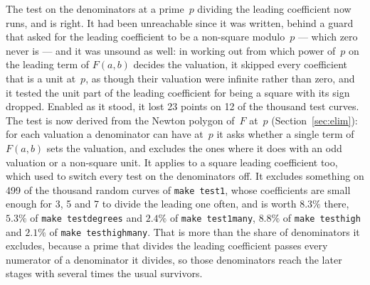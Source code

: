 \documentclass[12pt,a4paper,oneside]{amsart}
\begin{document}
The test on the denominators at a prime~$p$ dividing the leading coefficient
now runs, and is right. It had been unreachable since it was written, behind
a guard that asked for the leading coefficient to be a non-square modulo~$p$
--- which zero never is --- and it was unsound as well: in working out from
which power of~$p$ on the leading term of $F(a,b)$ decides the valuation, it
skipped every coefficient that is a unit at~$p$, as though their valuation
were infinite rather than zero, and it tested the unit part of the leading
coefficient for being a square with its sign dropped. Enabled as it stood, it
lost 23 points on 12 of the thousand test curves. The test is now derived
from the Newton polygon of~$F$ at~$p$ (Section~\ref{sec:elim}): for each
valuation a denominator can have at~$p$ it asks whether a single term of
$F(a,b)$ sets the valuation, and excludes the ones where it does with an
odd valuation or a non-square unit. It applies to a square leading
coefficient too, which used to switch every test on the denominators off.
It excludes something on 499 of the thousand random curves of \texttt{make
test1}, whose coefficients are small enough for 3, 5 and 7 to divide the
leading one often, and is worth $8.3\%$ there, $5.3\%$ of \texttt{make testdegrees} and
$2.4\%$ of \texttt{make test1many}, $8.8\%$ of \texttt{make testhigh}
and $2.1\%$ of \texttt{make testhighmany}. That is more than the share
of denominators it excludes, because a prime that divides the leading
coefficient passes every numerator of a denominator it divides, so those
denominators reach the later stages with several times the usual survivors.
\end{document}
